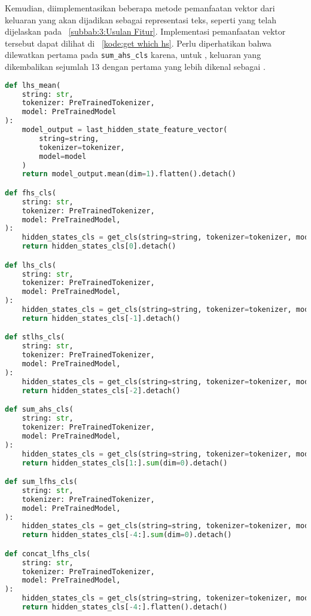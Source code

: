 Kemudian, diimplementasikan beberapa metode pemanfaatan vektor dari keluaran  yang akan dijadikan sebagai representasi teks, seperti yang telah dijelaskan pada \subbab{}~\ref{subbab:3:Usulan Fitur}. Implementasi pemanfaatan vektor tersebut dapat dilihat di \kode{}~\ref{kode:get which hs}. Perlu diperhatikan bahwa dilewatkan \hs{} pertama pada \lstinline{sum_ahs_cls} karena, untuk \bert{}, keluaran \hs{} yang dikembalikan sejumlah 13 dengan \hs{} pertama yang lebih dikenal sebagai \embedding{}.
\begin{lstlisting}[language=Python, caption={Metode pengambilan vektor dari \hs{}}, label={kode:get which hs}]
def lhs_mean(
    string: str,
    tokenizer: PreTrainedTokenizer,
    model: PreTrainedModel
):
    model_output = last_hidden_state_feature_vector(
        string=string,
        tokenizer=tokenizer,
        model=model
    )
    return model_output.mean(dim=1).flatten().detach()

def fhs_cls(
    string: str,
    tokenizer: PreTrainedTokenizer,
    model: PreTrainedModel,
):
    hidden_states_cls = get_cls(string=string, tokenizer=tokenizer, model=model)
    return hidden_states_cls[0].detach()

def lhs_cls(
    string: str,
    tokenizer: PreTrainedTokenizer,
    model: PreTrainedModel,
):
    hidden_states_cls = get_cls(string=string, tokenizer=tokenizer, model=model)
    return hidden_states_cls[-1].detach()

def stlhs_cls(
    string: str,
    tokenizer: PreTrainedTokenizer,
    model: PreTrainedModel,
):
    hidden_states_cls = get_cls(string=string, tokenizer=tokenizer, model=model)
    return hidden_states_cls[-2].detach()

def sum_ahs_cls(
    string: str,
    tokenizer: PreTrainedTokenizer,
    model: PreTrainedModel,
):
    hidden_states_cls = get_cls(string=string, tokenizer=tokenizer, model=model)
    return hidden_states_cls[1:].sum(dim=0).detach()

def sum_lfhs_cls(
    string: str,
    tokenizer: PreTrainedTokenizer,
    model: PreTrainedModel,
):
    hidden_states_cls = get_cls(string=string, tokenizer=tokenizer, model=model)
    return hidden_states_cls[-4:].sum(dim=0).detach()

def concat_lfhs_cls(
    string: str,
    tokenizer: PreTrainedTokenizer,
    model: PreTrainedModel,
):
    hidden_states_cls = get_cls(string=string, tokenizer=tokenizer, model=model)
    return hidden_states_cls[-4:].flatten().detach()
\end{lstlisting}









